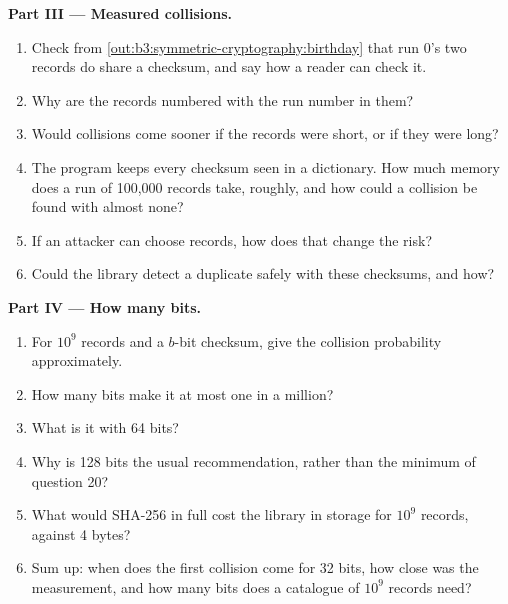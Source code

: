 \begin{problem}
\medskip\noindent\textbf{Part III --- Measured collisions.}
\begin{enumerate}[resume]
  \item Check from \cref{out:b3:symmetric-cryptography:birthday} that run 0's two records do share a checksum, and say how a reader can check it.
  \item Why are the records numbered with the run number in them?
  \item Would collisions come sooner if the records were short, or if they were long?
  \item The program keeps every checksum seen in a dictionary. How much memory does a run of 100,000 records take, roughly, and how could a collision be found with almost none?
  \item If an attacker can choose records, how does that change the risk?
  \item Could the library detect a duplicate safely with these checksums, and how?
\end{enumerate}

\medskip\noindent\textbf{Part IV --- How many bits.}
\begin{enumerate}[resume]
  \item For $10^9$ records and a $b$-bit checksum, give the collision probability approximately.
  \item How many bits make it at most one in a million?
  \item What is it with 64 bits?
  \item Why is 128 bits the usual recommendation, rather than the minimum of question 20?
  \item What would SHA-256 in full cost the library in storage for $10^9$ records, against 4 bytes?
  \item Sum up: when does the first collision come for 32 bits, how close was the measurement, and how many bits does a catalogue of $10^9$ records need?
\end{enumerate}
\end{problem}
